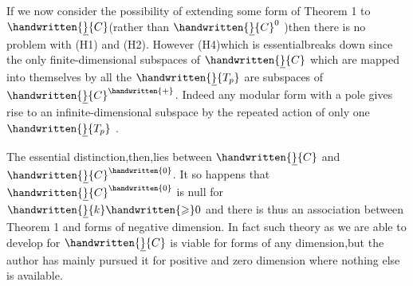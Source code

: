 If we now consider the possibility of extending some form of Theorem 1 to $\handwritten{\underline}{C}$(rather than $\handwritten{\underline}{C}^{0}$ )then there is no problem with (H1) and (H2). However\deleted{\unsure{,}} (H4)\handwritten{,}which is essential\handwritten{,}breaks down since the only finite-dimensional subspaces of $\handwritten{\underline}{C}$ which are mapped into themselves by all the $\handwritten{\underline}{T_p}$ are subspaces of $\handwritten{\underline}{C}^{\handwritten{+}}$. Indeed any modular form with a pole gives rise to an infinite-dimensional subspace by the repeated action of only one $\handwritten{\underline}{T_p}$ .

The essential distinction,then,lies between $\handwritten{\underline}{C}$ and $\handwritten{\underline}{C}^{\handwritten{0}}$. It so happens that $\handwritten{\underline}{C}^{\handwritten{0}}$ is null for $\handwritten{\underline}{k}\handwritten{\geqslant}0$ and there is thus an association between Theorem 1 and forms of negative dimension. In fact such theory as we are able to develop for $\handwritten{\underline}{C}$ is viable for forms of any dimension,but the author has mainly pursued it for positive and zero dimension where nothing else is available.

